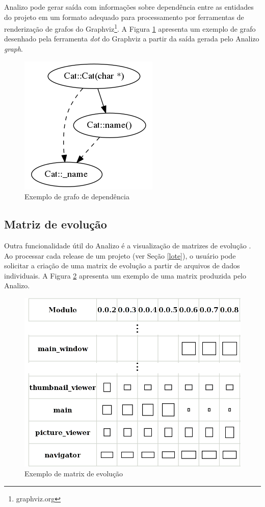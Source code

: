 \documentclass{article}
\begin{document}
Analizo pode gerar saída com informações sobre dependência entre as entidades
do projeto em um formato adequado para processamento por ferramentas de
renderização de grafos do Graphviz\footnote{graphviz.org}. A Figura \ref{sample-graph} apresenta um
exemplo de grafo desenhado pela ferramenta {\it dot} do Graphviz a partir da saída
gerada pelo Analizo {\it graph}.

\begin{figure}[h]
\center
\includegraphics[scale=0.4]{sample-graph.png}
\caption{Exemplo de grafo de dependência}
\label{sample-graph}
\end{figure}

\subsection{Matriz de evolução}

Outra funcionalidade útil do Analizo é a visualização de matrizes de evolução
\cite{Lanza2001}. Ao processar cada release de um projeto (ver Seção
\ref{lote}), o usuário pode solicitar a criação de uma matrix de evolução a
partir de arquivos de dados individuais. A Figura \ref{sample-evolution-matrix}
apresenta um exemplo de uma matrix produzida pelo Analizo.

\begin{figure}[h]
\center
\includegraphics[scale=0.2]{sample-evolution-matrix.png}
\caption{Exemplo de matrix de evolução}
\label{sample-evolution-matrix}
\end{figure}
\end{document}
